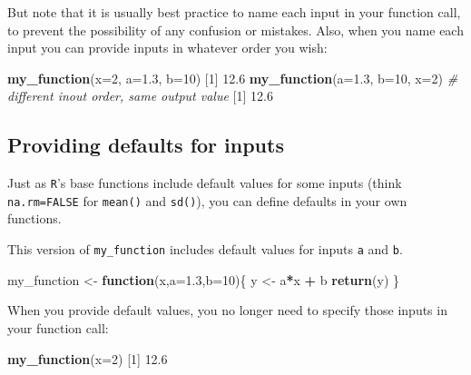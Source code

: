 \documentclass[
]{book}
\newenvironment{Shaded}{\begin{snugshade}}{\end{snugshade}}
\newcommand{\CommentTok}[1]{\textcolor[rgb]{0.56,0.35,0.01}{\textit{#1}}}
\newcommand{\ControlFlowTok}[1]{\textcolor[rgb]{0.13,0.29,0.53}{\textbf{#1}}}
\newcommand{\DataTypeTok}[1]{\textcolor[rgb]{0.13,0.29,0.53}{#1}}
\newcommand{\DecValTok}[1]{\textcolor[rgb]{0.00,0.00,0.81}{#1}}
\newcommand{\FloatTok}[1]{\textcolor[rgb]{0.00,0.00,0.81}{#1}}
\newcommand{\KeywordTok}[1]{\textcolor[rgb]{0.13,0.29,0.53}{\textbf{#1}}}
\newcommand{\NormalTok}[1]{#1}
\newcommand{\OperatorTok}[1]{\textcolor[rgb]{0.81,0.36,0.00}{\textbf{#1}}}
\newcommand{\StringTok}[1]{\textcolor[rgb]{0.31,0.60,0.02}{#1}}
\begin{document}
But note that it is usually best practice to name each input in your function call, to prevent the possibility of any confusion or mistakes. Also, when you name each input you can provide inputs in whatever order you wish:

\begin{Shaded}
\begin{Highlighting}[]
\KeywordTok{my_function}\NormalTok{(}\DataTypeTok{x=}\DecValTok{2}\NormalTok{, }\DataTypeTok{a=}\FloatTok{1.3}\NormalTok{, }\DataTypeTok{b=}\DecValTok{10}\NormalTok{)}
\NormalTok{[}\DecValTok{1}\NormalTok{] }\FloatTok{12.6}
\KeywordTok{my_function}\NormalTok{(}\DataTypeTok{a=}\FloatTok{1.3}\NormalTok{, }\DataTypeTok{b=}\DecValTok{10}\NormalTok{, }\DataTypeTok{x=}\DecValTok{2}\NormalTok{) }\CommentTok{# different inout order, same output value}
\NormalTok{[}\DecValTok{1}\NormalTok{] }\FloatTok{12.6}
\end{Highlighting}
\end{Shaded}

\hypertarget{providing-defaults-for-inputs}{%
\subsection*{Providing defaults for inputs}\label{providing-defaults-for-inputs}}

Just as \texttt{R}'s base functions include default values for some inputs (think \texttt{na.rm=FALSE} for \texttt{mean()} and \texttt{sd()}), you can define defaults in your own functions.

This version of \texttt{my\_function} includes default values for inputs \texttt{a} and \texttt{b}.

\begin{Shaded}
\begin{Highlighting}[]
\NormalTok{my_function <-}\StringTok{ }\ControlFlowTok{function}\NormalTok{(x,}\DataTypeTok{a=}\FloatTok{1.3}\NormalTok{,}\DataTypeTok{b=}\DecValTok{10}\NormalTok{)\{}
\NormalTok{  y <-}\StringTok{ }\NormalTok{a}\OperatorTok{*}\NormalTok{x }\OperatorTok{+}\StringTok{ }\NormalTok{b}
  \KeywordTok{return}\NormalTok{(y)}
\NormalTok{\}}
\end{Highlighting}
\end{Shaded}

When you provide default values, you no longer need to specify those inputs in your function call:

\begin{Shaded}
\begin{Highlighting}[]
\KeywordTok{my_function}\NormalTok{(}\DataTypeTok{x=}\DecValTok{2}\NormalTok{)}
\NormalTok{[}\DecValTok{1}\NormalTok{] }\FloatTok{12.6}
\end{Highlighting}
\end{Shaded}
\end{document}
